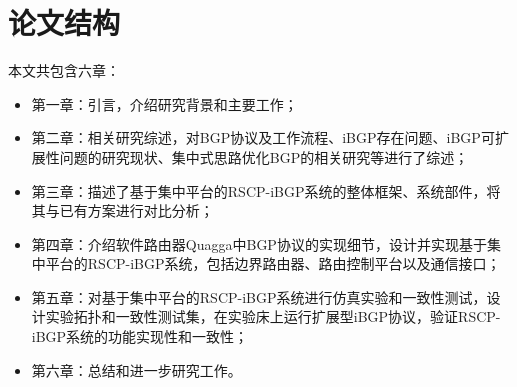 \section{论文结构}
本文共包含六章：
\begin{itemize}
\item 第一章：引言，介绍研究背景和主要工作；
\item 第二章：相关研究综述，对BGP协议及工作流程、iBGP存在问题、iBGP可扩展性问题的研究现状、集中式思路优化BGP的相关研究等进行了综述；
\item 第三章：描述了基于集中平台的RSCP-iBGP系统的整体框架、系统部件，将其与已有方案进行对比分析；
\item 第四章：介绍软件路由器Quagga中BGP协议的实现细节，设计并实现基于集中平台的RSCP-iBGP系统，包括边界路由器、路由控制平台以及通信接口；
\item 第五章：对基于集中平台的RSCP-iBGP系统进行仿真实验和一致性测试，设计实验拓扑和一致性测试集，在实验床上运行扩展型iBGP协议，验证RSCP-iBGP系统的功能实现性和一致性；
\item 第六章：总结和进一步研究工作。
\end{itemize}
